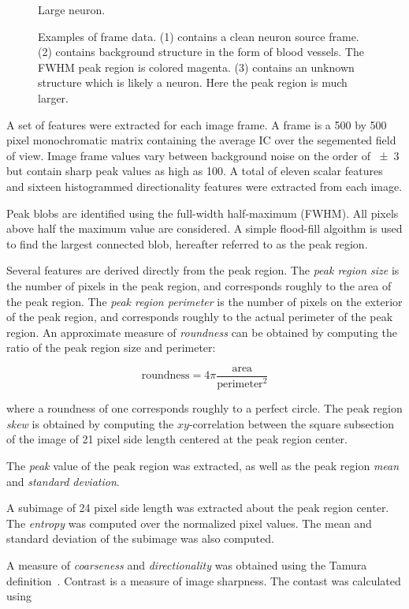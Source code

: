 \documentclass[11pt]{article}
\begin{document}
\begin{figure}[h]
\begin{minipage}{.33\textwidth}
      \caption{\footnotesize Large neuron. }
      \label{fig:test2}
    \end{minipage}
    \caption{Examples of frame data. (1) contains a clean neuron source frame. (2) contains background structure in the form of blood vessels. The FWHM peak region is colored magenta. (3) contains an unknown structure which is likely a neuron. Here the peak region is much larger. }
\end{figure}

A set of features were extracted for each image frame.
A frame is a \num{500} by \num{500} pixel monochromatic matrix containing the average IC over the segemented field of view. 
Image frame values vary between background noise on the order of \num{+-3} but contain sharp peak values as high as \num{100}.
A total of eleven scalar features and sixteen histogrammed directionality features were extracted from each image.

Peak blobs are identified using the full-width half-maximum (FWHM). 
All pixels above half the maximum value are considered.
A simple flood-fill algoithm is used to find the largest connected blob, hereafter referred to as the peak region.

Several features are derived directly from the peak region.
The \emph{peak region size} is the number of pixels in the peak region, and corresponds roughly to the area of the peak region.
The \emph{peak region perimeter} is the number of pixels on the exterior of the peak region, and corresponds roughly to the actual perimeter of the peak region. 
An approximate measure of \emph{roundness} can be obtained by computing the ratio of the peak region size and perimeter:

$$
\text{roundness} = 4\pi \frac{\text{area}}{\text{perimeter}^2}
$$

\noindent
where a roundness of one corresponds roughly to a perfect circle.
The peak region \emph{skew} is obtained by computing the $xy$-correlation between the square subsection of the image of \num{21} pixel side length centered at the peak region center.

The \emph{peak} value of the peak region was extracted, as well as the peak region \emph{mean} and \emph{standard deviation}.

A subimage of \num{24} pixel side length was extracted about the peak region center.
The \emph{entropy} was computed over the normalized pixel values.
The mean and standard deviation of the subimage was also computed.

A measure of \emph{coarseness} and \emph{directionality} was obtained using the Tamura definition~\cite{Tamura}.
Contrast is a measure of image sharpness. 
The contast was calculated using
\end{document}
